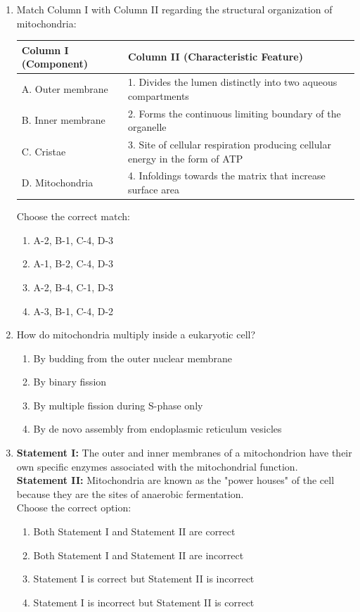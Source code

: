 \documentclass[11pt, a4paper]{article}
\begin{document}
\begin{enumerate}[label=\textbf{\arabic*.}, leftmargin=*, itemsep=8pt]
    \item Match Column I with Column II regarding the structural organization of mitochondria:
    \begin{center}
    \begin{tabular}{@{}ll@{}}
        \toprule
        \textbf{Column I (Component)} & \textbf{Column II (Characteristic Feature)} \\
        \midrule
        A. Outer membrane & 1. Divides the lumen distinctly into two aqueous compartments \\
        B. Inner membrane & 2. Forms the continuous limiting boundary of the organelle \\
        C. Cristae & 3. Site of cellular respiration producing cellular energy in the form of ATP \\
        D. Mitochondria & 4. Infoldings towards the matrix that increase surface area \\
        \bottomrule
    \end{tabular}
    \end{center}
    Choose the correct match:
    \begin{enumerate}[label=(\alph*)]
        \item A-2, B-1, C-4, D-3
        \item A-1, B-2, C-4, D-3
        \item A-2, B-4, C-1, D-3
        \item A-3, B-1, C-4, D-2
    \end{enumerate}

    \item How do mitochondria multiply inside a eukaryotic cell?
    \begin{enumerate}[label=(\alph*)]
        \item By budding from the outer nuclear membrane
        \item By binary fission
        \item By multiple fission during S-phase only
        \item By de novo assembly from endoplasmic reticulum vesicles
    \end{enumerate}

    \item \textbf{Statement I:} The outer and inner membranes of a mitochondrion have their own specific enzymes associated with the mitochondrial function.\\
    \textbf{Statement II:} Mitochondria are known as the "power houses" of the cell because they are the sites of anaerobic fermentation.\\
    Choose the correct option:
    \begin{enumerate}[label=(\alph*)]
        \item Both Statement I and Statement II are correct
        \item Both Statement I and Statement II are incorrect
        \item Statement I is correct but Statement II is incorrect
        \item Statement I is incorrect but Statement II is correct
    \end{enumerate}


\end{enumerate}
\end{document}
